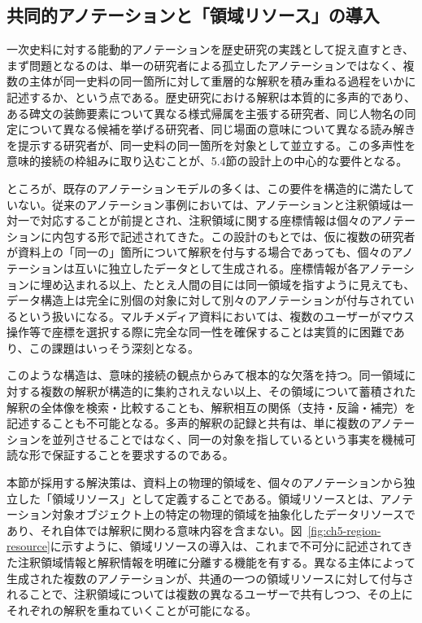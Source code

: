 \subsection{共同的アノテーションと「領域リソース」の導入}

一次史料に対する能動的アノテーションを歴史研究の実践として捉え直すとき、まず問題となるのは、単一の研究者による孤立したアノテーションではなく、複数の主体が同一史料の同一箇所に対して重層的な解釈を積み重ねる過程をいかに記述するか、という点である。歴史研究における解釈は本質的に多声的であり、ある碑文の装飾要素について異なる様式帰属を主張する研究者、同じ人物名の同定について異なる候補を挙げる研究者、同じ場面の意味について異なる読み解きを提示する研究者が、同一史料の同一箇所を対象として並立する。この多声性を意味的接続の枠組みに取り込むことが、5.4節の設計上の中心的な要件となる。

ところが、既存のアノテーションモデルの多くは、この要件を構造的に満たしていない。従来のアノテーション事例においては、アノテーションと注釈領域は一対一で対応することが前提とされ、注釈領域に関する座標情報は個々のアノテーションに内包する形で記述されてきた。この設計のもとでは、仮に複数の研究者が資料上の「同一の」箇所について解釈を付与する場合であっても、個々のアノテーションは互いに独立したデータとして生成される。座標情報が各アノテーションに埋め込まれる以上、たとえ人間の目には同一領域を指すように見えても、データ構造上は完全に別個の対象に対して別々のアノテーションが付与されているという扱いになる。マルチメディア資料においては、複数のユーザーがマウス操作等で座標を選択する際に完全な同一性を確保することは実質的に困難であり、この課題はいっそう深刻となる。

このような構造は、意味的接続の観点からみて根本的な欠落を持つ。同一領域に対する複数の解釈が構造的に集約されえない以上、その領域について蓄積された解釈の全体像を検索・比較することも、解釈相互の関係（支持・反論・補完）を記述することも不可能となる。多声的解釈の記録と共有は、単に複数のアノテーションを並列させることではなく、同一の対象を指しているという事実を機械可読な形で保証することを要求するのである。

本節が採用する解決策は、資料上の物理的領域を、個々のアノテーションから独立した「領域リソース」として定義することである。領域リソースとは、アノテーション対象オブジェクト上の特定の物理的領域を抽象化したデータリソースであり、それ自体では解釈に関わる意味内容を含まない。図~\ref{fig:ch5-region-resource}に示すように、領域リソースの導入は、これまで不可分に記述されてきた注釈領域情報と解釈情報を明確に分離する機能を有する。異なる主体によって生成された複数のアノテーションが、共通の一つの領域リソースに対して付与されることで、注釈領域については複数の異なるユーザーで共有しつつ、その上にそれぞれの解釈を重ねていくことが可能になる。

